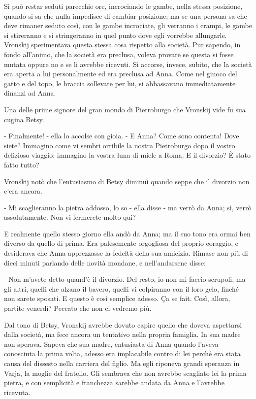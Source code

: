 Si può restar seduti parecchie ore, incrociando le gambe, nella stessa posizione, quando si sa che nulla impedisce di cambiar posizione; ma se una persona sa che deve rimaner seduto così, con le gambe incrociate, gli verranno i crampi, le gambe si stireranno e si stringeranno in quel punto dove egli vorrebbe allungarle. Vronskij sperimentava questa stessa cosa rispetto alla società. Pur sapendo, in fondo all'animo, che la società era preclusa, voleva provare se questa si fosse mutata oppure no e se li avrebbe ricevuti. Si accorse, invece, subito, che la società era aperta a lui personalmente ed era preclusa ad Anna. Come nel giuoco del gatto e del topo, le braccia sollevate per lui, si abbassavano immediatamente dinanzi ad Anna. 

Una delle prime signore del gran mondo di Pietroburgo che Vronskij vide fu sua cugina Betsy. 

- Finalmente! - ella lo accolse con gioia. - E Anna? Come sono contenta! Dove siete? Immagino come vi sembri orribile la nostra Pietroburgo dopo il vostro delizioso viaggio; immagino la vostra luna di miele a Roma. E il divorzio? È stato fatto tutto? 

Vronskij notò che l'entusiasmo di Betsy diminuì quando seppe che il divorzio non c'era ancora. 

- Mi scaglieranno la pietra addosso, lo so - ella disse - ma verrò da Anna; sì, verrò assolutamente. Non vi fermerete molto qui? 

E realmente quello stesso giorno ella andò da Anna; ma il suo tono era ormai ben diverso da quello di prima. Era palesemente orgogliosa del proprio coraggio, e desiderava che Anna apprezzasse la fedeltà della sua amicizia. Rimase non più di dieci minuti parlando delle novità mondane, e nell'andarsene disse: 

- Non m'avete detto quand'è il divorzio. Del resto, io non mi faccio scrupoli, ma gli altri, quelli che alzano il bavero, quelli vi colpiranno con il loro gelo, finché non sarete sposati. E questo è così semplice adesso. Ça se fait. Così, allora, partite venerdì? Peccato che non ci vedremo più. 

Dal tono di Betsy, Vronskij avrebbe dovuto capire quello che doveva aspettarsi dalla società, ma fece ancora un tentativo nella propria famiglia. In sua madre non sperava. Sapeva che sua madre, entusiasta di Anna quando l'aveva conosciuta la prima volta, adesso era implacabile contro di lei perché era stata causa del dissesto nella carriera del figlio. Ma egli riponeva grandi speranza in Varja, la moglie del fratello. Gli sembrava che non avrebbe scagliato lei la prima pietra, e con semplicità e franchezza sarebbe andata da Anna e l'avrebbe ricevuta. 

